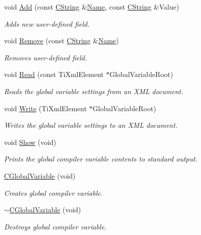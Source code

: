 \begin{DoxyCompactItemize}
void \hyperlink{classCGlobalVariable_a0261d0ff3fbc60da39d8aa37c92fbd37}{Add} (const \hyperlink{classCString}{C\-String} \&\hyperlink{classCGlobalVariable_ad969569563c43f2e531048f12680e86b}{Name}, const \hyperlink{classCString}{C\-String} \&Value)
\begin{DoxyCompactList}\small\item\em Adds new user-\/defined field. \end{DoxyCompactList}\item 
void \hyperlink{classCGlobalVariable_a650887d53d1edd59dc2a22871d5fc563}{Remove} (const \hyperlink{classCString}{C\-String} \&\hyperlink{classCGlobalVariable_ad969569563c43f2e531048f12680e86b}{Name})
\begin{DoxyCompactList}\small\item\em Removes user-\/defined field. \end{DoxyCompactList}\item 
void \hyperlink{classCGlobalVariable_a78b75495505a8ffc5dd97b6fa364dff4}{Read} (const Ti\-Xml\-Element $\ast$Global\-Variable\-Root)
\begin{DoxyCompactList}\small\item\em Reads the global variable settings from an X\-M\-L document. \end{DoxyCompactList}\item 
void \hyperlink{classCGlobalVariable_a3ce7991ab6c5a69083db7f72020c2f14}{Write} (Ti\-Xml\-Element $\ast$Global\-Variable\-Root)
\begin{DoxyCompactList}\small\item\em Writes the global variable settings to an X\-M\-L document. \end{DoxyCompactList}\item 
void \hyperlink{classCGlobalVariable_a82a023e4410cc2ad2261faf0024925f3}{Show} (void)
\begin{DoxyCompactList}\small\item\em Prints the global compiler variable contents to standard output. \end{DoxyCompactList}\item 
\hyperlink{classCGlobalVariable_a38fcc9740f5bff89ec925d4a28642be3}{C\-Global\-Variable} (void)
\begin{DoxyCompactList}\small\item\em Creates global compiler variable. \end{DoxyCompactList}\item 
\hyperlink{classCGlobalVariable_abad0e58f8362841438da31bd7503eb04}{$\sim$\-C\-Global\-Variable} (void)
\begin{DoxyCompactList}\small\item\em Destroys global compiler variable. \end{DoxyCompactList}\end{DoxyCompactItemize}
